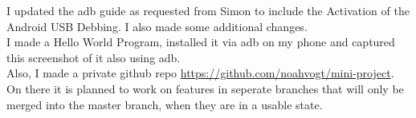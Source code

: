 I updated the adb guide as requested from Simon to include the Activation of the Android USB Debbing. I also made some additional changes.\\

I made a Hello World Program, installed it via adb on my phone and captured this screenshot of it also using adb.\\

Also, I made a private github repo \url{https://github.com/noahvogt/mini-project}.\\

On there it is planned to work on features in seperate branches that will only be merged into the master branch, when they are in a usable state.

\endgroup

\vspace{4cm}
\begingroup
\setlength{\intextsep}{10pt}
\setlength{\columnsep}{15pt}

